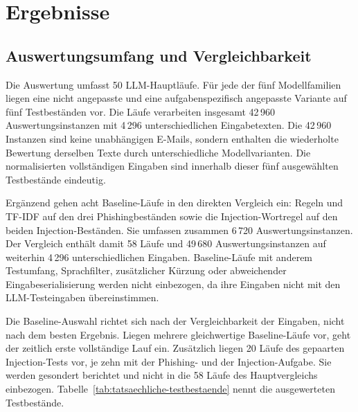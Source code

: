 \documentclass[12pt,twoside=false,a4paper,parskip]{scrbook}
\begin{document}
\section{Ergebnisse}\label{sec:ergebnisse}

\subsection{Auswertungsumfang und Vergleichbarkeit}\label{sec:ergebnisumfang}

Die Auswertung umfasst 50 LLM-Hauptläufe. Für jede der fünf Modellfamilien liegen eine nicht angepasste und eine aufgabenspezifisch angepasste Variante auf fünf Testbeständen vor. Die Läufe verarbeiten insgesamt 42\,960 Auswertungsinstanzen mit 4\,296 unterschiedlichen Eingabetexten. Die 42\,960 Instanzen sind keine unabhängigen E-Mails, sondern enthalten die wiederholte Bewertung derselben Texte durch unterschiedliche Modellvarianten. Die normalisierten vollständigen Eingaben sind innerhalb dieser fünf ausgewählten Testbestände eindeutig.

Ergänzend gehen acht Baseline-Läufe in den direkten Vergleich ein: Regeln und TF-IDF auf den drei Phishingbeständen sowie die Injection-Wortregel auf den beiden Injection-Beständen. Sie umfassen zusammen 6\,720 Auswertungsinstanzen. Der Vergleich enthält damit 58 Läufe und 49\,680 Auswertungsinstanzen auf weiterhin 4\,296 unterschiedlichen Eingaben. Baseline-Läufe mit anderem Testumfang, Sprachfilter, zusätzlicher Kürzung oder abweichender Eingabeserialisierung werden nicht einbezogen, da ihre Eingaben nicht mit den LLM-Testeingaben übereinstimmen.

Die Baseline-Auswahl richtet sich nach der Vergleichbarkeit der Eingaben, nicht nach dem besten Ergebnis. Liegen mehrere gleichwertige Baseline-Läufe vor, geht der zeitlich erste vollständige Lauf ein. Zusätzlich liegen 20 Läufe des gepaarten Injection-Tests vor, je zehn mit der Phishing- und der Injection-Aufgabe. Sie werden gesondert berichtet und nicht in die 58 Läufe des Hauptvergleichs einbezogen. Tabelle~\ref{tab:tatsaechliche-testbestaende} nennt die ausgewerteten Testbestände.
\end{document}
